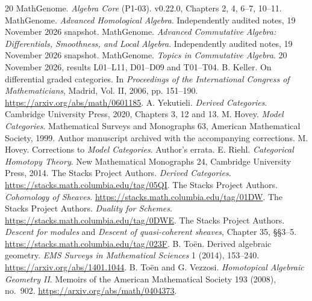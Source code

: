 \begingroup
\small
\begin{thebibliography}{20}
\setlength{\itemsep}{0.2\baselineskip}
\setlength{\parsep}{0pt}
 MathGenome. \emph{Algebra Core} (P1-03). v0.22.0,
  Chapters 2, 4, 6--7, 10--11.
 MathGenome. \emph{Advanced Homological Algebra}.
  Independently audited notes, 19 November 2026 snapshot.
 MathGenome. \emph{Advanced Commutative Algebra:
  Differentials, Smoothness, and Local Algebra}. Independently audited
  notes, 19 November 2026 snapshot.
 MathGenome. \emph{Topics in Commutative Algebra}.
  20 November 2026, results L01--L11, D01--D09 and T01--T04.
 B. Keller. On differential graded categories.
  In \emph{Proceedings of the International Congress of Mathematicians},
  Madrid, Vol. II, 2006, pp. 151--190. \url{https://arxiv.org/abs/math/0601185}.
 A. Yekutieli. \emph{Derived Categories}.
  Cambridge University Press, 2020, Chapters 3, 12 and 13.
 M. Hovey. \emph{Model Categories}.
  Mathematical Surveys and Monographs 63, American Mathematical Society,
  1999. Author manuscript archived with the accompanying corrections.
 M. Hovey. Corrections to \emph{Model Categories}.
  Author's errata.
 E. Riehl. \emph{Categorical Homotopy Theory}.
  New Mathematical Monographs 24, Cambridge University Press, 2014.
 The Stacks Project Authors. \emph{Derived Categories}.
  \url{https://stacks.math.columbia.edu/tag/05QI}.
 The Stacks Project Authors. \emph{Cohomology of Sheaves}.
  \url{https://stacks.math.columbia.edu/tag/01DW}.
 The Stacks Project Authors. \emph{Duality for Schemes}.
  \url{https://stacks.math.columbia.edu/tag/0DWE}.
 The Stacks Project Authors. \emph{Descent for modules}
  and \emph{Descent of quasi-coherent sheaves}, Chapter 35, \S\S3--5.
  \url{https://stacks.math.columbia.edu/tag/023F}.
 B. To\"en. Derived algebraic geometry.
  \emph{EMS Surveys in Mathematical Sciences} 1 (2014), 153--240.
  \url{https://arxiv.org/abs/1401.1044}.
 B. To\"en and G. Vezzosi.
  \emph{Homotopical Algebraic Geometry II}.
  Memoirs of the American Mathematical Society 193 (2008), no.\ 902.
  \url{https://arxiv.org/abs/math/0404373}.
\end{thebibliography}
\endgroup
